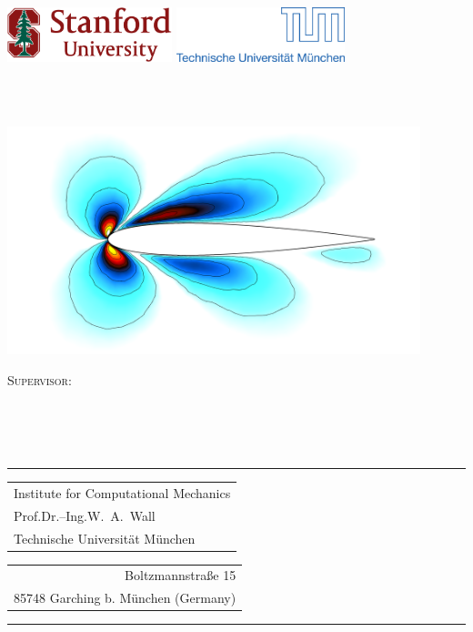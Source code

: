 \begin{titlepage}
\thispagestyle{empty}
\vspace{-1.5cm}
\includegraphics[height=1.5772cm]{./fig/stanford-logo.png}
\hfill
\includegraphics[height=1.5772cm]{./fig/tum.eps}
\vfill

\begin{center}
\Huge{\thesistitle}
\\
\vspace{0.2cm}
\LARGE{\Author}
\\
\vspace{0.2cm}
\large{\thesistype}
\end{center}
\vspace{0.1cm}
%
\begin{center}
\includegraphics[width=12cm]{fig/titlepage_figure2}
\end{center}
%
\vfill
%
\begin{minipage}[c]{1.0\textwidth}
\centering
{\large \scshape Supervisor:}\\
{\Supervisor}\\ %
\texttt{\Mail}\\
\end{minipage}
%
\vspace{1cm}\\
%
\rule{\textwidth}{1pt}
%
\begin{tabular}[t]{l}
Institute for Computational Mechanics
\\
  Prof.\@ Dr.--Ing.\@ W.\ A.\ Wall
\\
Technische Universit\"at M\"unchen
\end{tabular}
\hfill
\begin{tabular}[t]{r}
\\
Boltzmannstra\ss e 15
\\
85748 Garching b. M\"unchen (Germany)\\
\end{tabular}
\rule{\textwidth}{1pt}


\end{titlepage}